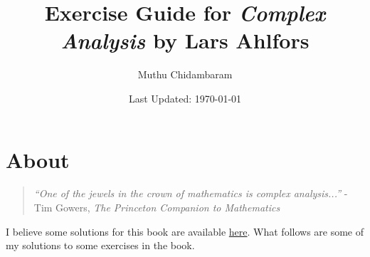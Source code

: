 \documentclass{article}
\begin{document}
\title{Exercise Guide for \textit{Complex Analysis} by Lars Ahlfors}
\author{Muthu Chidambaram}
\date{Last Updated: \today} 

\maketitle

\tableofcontents
\newpage 

\section*{About}

\begin{quote}
        \textit{``One of the jewels in the crown of mathematics is complex analysis...''} 
        - Tim Gowers, \textit{The Princeton Companion to Mathematics}
\end{quote}

I believe some solutions for this book are available \href{https://www.springer.com/cda/content/document/cda_downloaddocument/sol-manual-complex-selected.pdf?SGWID=0-0-45-1635450-p181547661}{here}.
What follows are some of my solutions to some exercises in the book. 


\end{document}

